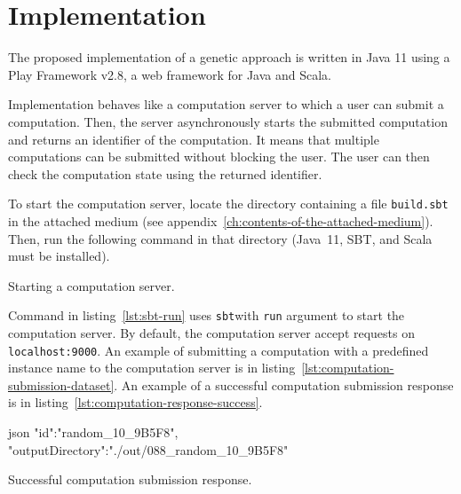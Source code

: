 \newpage
\section{Implementation}\label{sec:implementation}

The proposed implementation of a genetic approach is written in Java 11
using a Play Framework v2.8\footnotemark[1], a web framework for Java and Scala.

Implementation behaves like a computation server to which
a user can submit a computation.
Then, the server asynchronously starts the submitted computation and returns an identifier of the computation.
It means that multiple computations can be submitted without blocking the user.
The user can then check the computation state using the returned identifier.

To start the computation server, locate the directory containing a file \verb|build.sbt| in the attached medium (see appendix~\ref{ch:contents-of-the-attached-medium}).
Then, run the following command in that directory (Java~11, SBT\footnotemark[3], and Scala must be installed).

\begin{listing}[h!]
    \caption[Starting a computation server]
    {Starting a computation server.}
    \label{lst:sbt-run}
\end{listing}

Command in listing~\ref{lst:sbt-run} uses \verb|sbt|\footnotemark[3] with \verb|run| argument to start the computation server.
By default, the computation server accept requests on \verb|localhost:9000|.
An example of submitting a computation with a predefined instance name to the computation server is in listing~\ref{lst:computation-submission-dataset}.
An example of a successful computation submission response is in listing~\ref{lst:computation-response-success}.

\begin{listing}[h!]
    \begin{cminted}[autogobble,breaklines=true]{json}
    {
        "id":"random_10_9B5F8",
        "outputDirectory":"./out/088_random_10_9B5F8"
    }
    \end{cminted}
    \caption[Successful computation submission response]
    {Successful computation submission response.}
    \label{lst:computation-response-success}
\end{listing}

